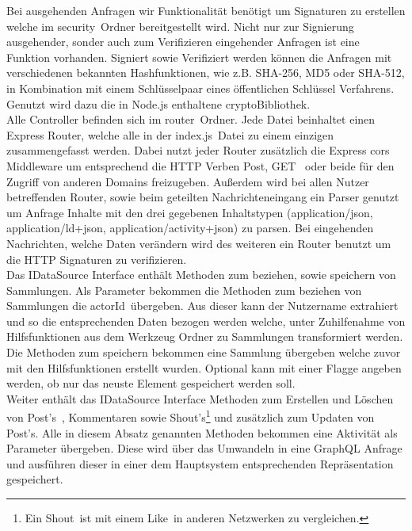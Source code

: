 Bei ausgehenden Anfragen wir Funktionalität benötigt um Signaturen zu erstellen welche im \glqq security\grqq~Ordner bereitgestellt wird. Nicht nur zur Signierung ausgehender, sonder auch zum Verifizieren eingehender Anfragen ist eine Funktion vorhanden. Signiert sowie Verifiziert werden können die Anfragen mit verschiedenen bekannten Hashfunktionen, wie z.B. SHA-256, MD5 oder SHA-512, in Kombination mit einem Schlüsselpaar eines öffentlichen Schlüssel Verfahrens. Genutzt wird dazu die in Node.js enthaltene \glqq crypto\grqq Bibliothek.\\

Alle Controller befinden sich im \glqq router\grqq~Ordner. Jede Datei beinhaltet einen Express Router, welche alle in der \glqq index.js\grqq~Datei zu einem einzigen zusammengefasst werden. Dabei nutzt jeder Router zusätzlich die Express \gls{cors} Middleware um entsprechend die HTTP Verben \glqq Post\grqq, \glqq GET\grqq~ oder beide für den Zugriff von anderen Domains freizugeben. Außerdem wird bei allen Nutzer betreffenden Router, sowie beim geteilten Nachrichteneingang ein Parser genutzt um Anfrage Inhalte mit den drei gegebenen Inhaltstypen (application/json, application/ld+json, application/activity+json) zu parsen. Bei eingehenden Nachrichten, welche Daten verändern wird des weiteren ein Router benutzt um die HTTP Signaturen zu verifizieren.\\
Das IDataSource Interface enthält Methoden zum beziehen, sowie speichern von Sammlungen. Als Parameter bekommen die Methoden zum beziehen von Sammlungen die \glqq actorId\grqq~übergeben. Aus dieser kann der Nutzername extrahiert und so die entsprechenden Daten bezogen werden welche, unter Zuhilfenahme von Hilfsfunktionen aus dem Werkzeug Ordner zu Sammlungen transformiert werden. Die Methoden zum speichern bekommen eine Sammlung übergeben welche zuvor mit den Hilfsfunktionen erstellt wurden. Optional kann mit einer Flagge angeben werden, ob nur das neuste Element gespeichert werden soll.\\

Weiter enthält das IDataSource Interface Methoden zum Erstellen und Löschen von \glqq Post's\grqq~, Kommentaren sowie \glqq Shout's\grqq\footnote{Ein \glqq Shout\grqq~ist mit einem \glqq Like\grqq~in anderen Netzwerken zu vergleichen.} und zusätzlich zum Updaten von \glqq Post's\grqq. Alle in diesem Absatz genannten Methoden bekommen eine Aktivität als Parameter übergeben. Diese wird über das Umwandeln in eine GraphQL Anfrage und ausführen dieser in einer dem Hauptsystem entsprechenden Repräsentation gespeichert.\\

